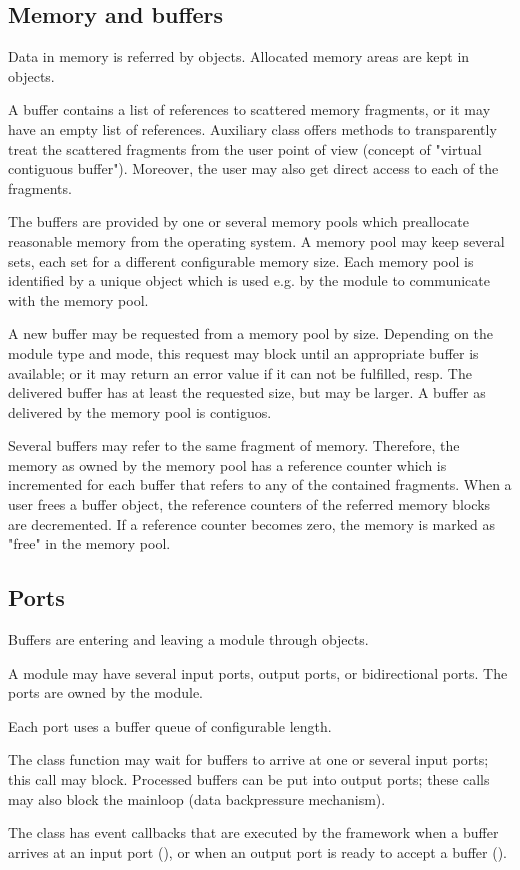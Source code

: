 \subsection{Memory and buffers}
Data in memory is referred by  objects. 
   Allocated memory areas are kept in  objects. 
\bcir
\item  A buffer contains a list of references to scattered memory 
      fragments, or it may have an empty list of references. 
      Auxiliary class  offers methods to transparently 
      treat the scattered fragments from the user point of view 
      (concept of "virtual contiguous buffer"). 
      Moreover, the user may also get direct access to each of the fragments.      
\item  The buffers are provided by one or several memory pools 
      which preallocate reasonable memory from the operating system. 
      A memory pool may keep several sets, each set for a different 
      configurable memory size. Each memory pool is identified by a 
      unique  object which is used e.g. by the module to 
      communicate with the memory pool.  
\item  A new buffer may be requested from a memory pool by size. 
      Depending on the module type and mode, this request may block until an 
      appropriate buffer is available; or it may return an error value 
      if it can not be fulfilled, resp. The delivered buffer has at 
      least the requested size, but may be larger. A buffer as 
      delivered by the memory pool is contiguos. 
\item  Several buffers may refer to the same fragment of memory. 
      Therefore, the memory as owned by the memory pool has a 
      reference counter which is incremented for each buffer 
      that refers to any of the contained fragments. When a user frees 
      a buffer object, the reference counters of the referred 
      memory blocks are decremented. If a reference counter becomes 
      zero, the memory is marked as "free" in the memory pool.
\ecir
\subsection{Ports}
Buffers are entering and leaving a module through  objects. 
\bcir
\item  A module may have several input ports, output ports, 
      or bidirectional ports. The ports are owned by the module.
\item  Each port uses a buffer queue of configurable length.
\item  The  class  function may wait for buffers 
      to arrive at one or several input ports; this call may block. 
      Processed buffers can be put into output ports; 
      these calls may also block the mainloop (data backpressure mechanism).
\item  The  class has event callbacks that are executed 
      by the framework when a buffer arrives at an input 
      port (), or when an output 
      port is ready to accept a buffer ().       
\ecir
